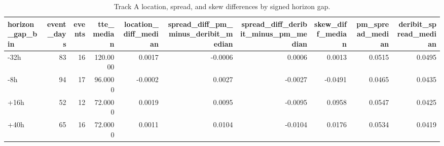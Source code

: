 \begin{table}
\caption{Track A location, spread, and skew differences by signed horizon gap.}
\label{tab:trackA_moments_by_gap}
\begin{tabular}{lrrrrrrrrr}
\toprule
horizon\_gap\_bin & event\_days & events & tte\_median & location\_diff\_median & spread\_diff\_pm\_minus\_deribit\_median & spread\_diff\_deribit\_minus\_pm\_median & skew\_diff\_median & pm\_spread\_median & deribit\_spread\_median \\
\midrule
-32h & 83 & 16 & 120.0000 & 0.0017 & -0.0006 & 0.0006 & 0.0013 & 0.0515 & 0.0495 \\
-8h & 94 & 17 & 96.0000 & -0.0002 & 0.0027 & -0.0027 & -0.0491 & 0.0465 & 0.0435 \\
+16h & 52 & 12 & 72.0000 & 0.0019 & 0.0095 & -0.0095 & 0.0958 & 0.0547 & 0.0425 \\
+40h & 65 & 16 & 72.0000 & 0.0011 & 0.0104 & -0.0104 & 0.0176 & 0.0534 & 0.0419 \\
\bottomrule
\end{tabular}
\end{table}
